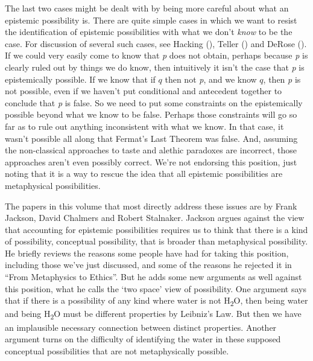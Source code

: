 \documentclass[
  10pt,
  letterpaper,
  DIV=11,
  numbers=noendperiod,
  twoside]{scrartcl}
\begin{document}
The last two cases might be dealt with by being more careful about what
an epistemic possibility is. There are quite simple cases in which we
want to resist the identification of epistemic possibilities with what
we don't \emph{know} to be the case. For discussion of several such
cases, see Hacking (), Teller
() and DeRose
(). If we could very easily come to know
that \emph{p} does not obtain, perhaps because \emph{p} is clearly ruled
out by things we do know, then intuitively it isn't the case that
\emph{p} is epistemically possible. If we know that if \(q\) then not
\emph{p}, and we know \(q\), then \emph{p} is not possible, even if we
haven't put conditional and antecedent together to conclude that
\emph{p} is false. So we need to put some constraints on the
epistemically possible beyond what we know to be false. Perhaps those
constraints will go so far as to rule out anything inconsistent with
what we know. In that case, it wasn't possible all along that Fermat's
Last Theorem was false. And, assuming the non-classical approaches to
taste and alethic paradoxes are incorrect, those approaches aren't even
possibly correct. We're not endorsing this position, just noting that it
is a way to rescue the idea that all epistemic possibilities are
metaphysical possibilities.

The papers in this volume that most directly address these issues are by
Frank Jackson, David Chalmers and Robert Stalnaker. Jackson argues
against the view that accounting for epistemic possibilities requires us
to think that there is a kind of possibility, conceptual possibility,
that is broader than metaphysical possibility. He briefly reviews the
reasons some people have had for taking this position, including those
we've just discussed, and some of the reasons he rejected it in ``From
Metaphysics to Ethics''. But he adds some new arguments as well against
this position, what he calls the `two space' view of possibility. One
argument says that if there is a possibility of any kind where water is
not H\textsubscript{2}O, then being water and being H\textsubscript{2}O
must be different properties by Leibniz's Law. But then we have an
implausible necessary connection between distinct properties. Another
argument turns on the difficulty of identifying the water in these
supposed conceptual possibilities that are not metaphysically possible.
\end{document}
